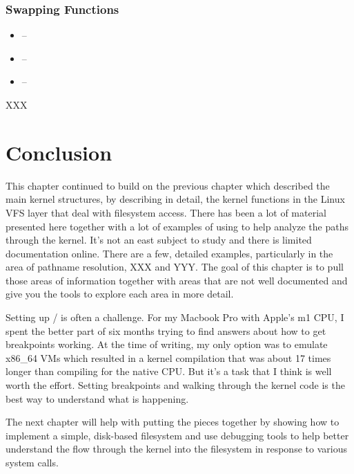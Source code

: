 \subsubsection{Swapping Functions}

\begin{itemize}
    \item {} --
    \item {} --
    \item {} --
\end{itemize}

\noindent
XXX


\section{Conclusion}

This chapter continued to build on the previous chapter which described the main kernel structures, by describing in detail, the kernel functions in the Linux VFS layer that deal with filesystem access. There has been a lot of material presented here together with a lot of examples of using  to help analyze the paths through the kernel. It's not an east subject to study and there is limited documentation online. There are a few, detailed examples, particularly in the area of pathname resolution, XXX and YYY. The goal of this chapter is to pull those areas of information together with areas that are not well documented and give you the tools to explore each area in more detail.

Setting up  /  is often a challenge. For my Macbook Pro with Apple's m1 CPU, I spent the better part of six months trying to find answers about how to get breakpoints working. At the time of writing, my only option was to emulate x86\_64 VMs which resulted in a kernel compilation that was about 17 times longer than compiling for the native CPU. But it's a task that I think is well worth the effort. Setting breakpoints and walking through the kernel code is the best way to understand what is happening.

The next chapter will help with putting the pieces together by showing how to implement a simple, disk-based filesystem and use debugging tools to help better understand the flow through the kernel into the filesystem in response to various system calls.


